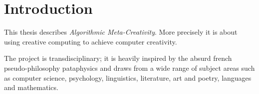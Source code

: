 
\chapter{Introduction}
\label{ch:intro}

\startcontents[chapters]
\minicontents



%

\brule %

This thesis describes \textit{Algorithmic Meta-Creativity}. More precisely it is about using creative computing to achieve computer creativity.

The project is transdisciplinary; it is heavily inspired by the absurd french pseudo-philosophy pataphysics and draws from a wide range of subject areas such as computer science, psychology, linguistics, literature, art and poetry, languages and mathematics.

